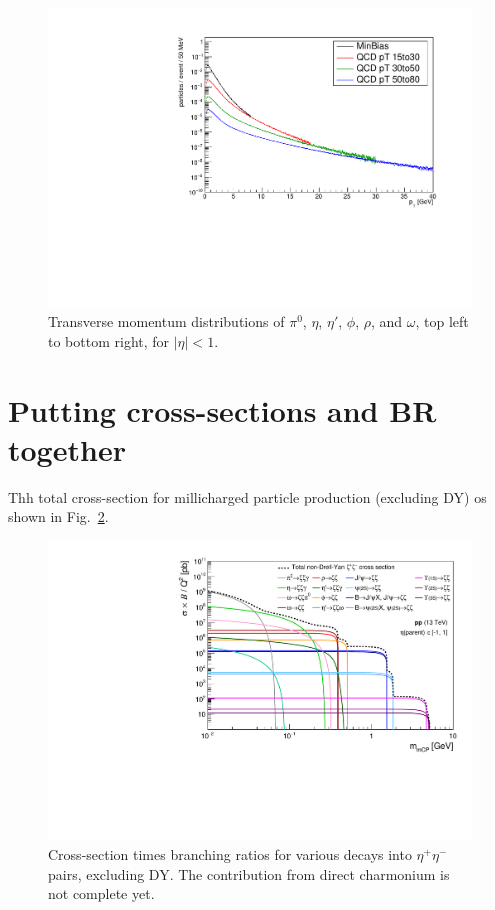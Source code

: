 \documentclass[12pt]{article}
\begin{document}
\begin{figure}
  \includegraphics[width=0.48\linewidth]{plots/h_omega.pdf}
  \caption{\protect Transverse momentum distributions of 
$\pi^0$, $\eta$, $\eta'$, $\phi$, $\rho$, and $\omega$, top left
to bottom right, for $|\eta| < 1$.}
\label{fig:mesons}
\end{figure}

\clearpage


\section{Putting cross-sections and BR together}

Thh total cross-section for millicharged particle production (excluding
DY) os shown in Fig.~\ref{fig:total-rates}.

\begin{figure}
  \begin{center}
  \includegraphics[width=0.8\linewidth]{../scripts/plot-xsecs/mcp-xsec.pdf}
  \caption{\protect Cross-section times branching ratios for various
    decays into $\eta^+ \eta^-$ pairs, excluding DY.  The contribution from
    direct charmonium is not complete yet.}
\label{fig:total-rates}
\end{center}
  \end{figure}




\end{document}
